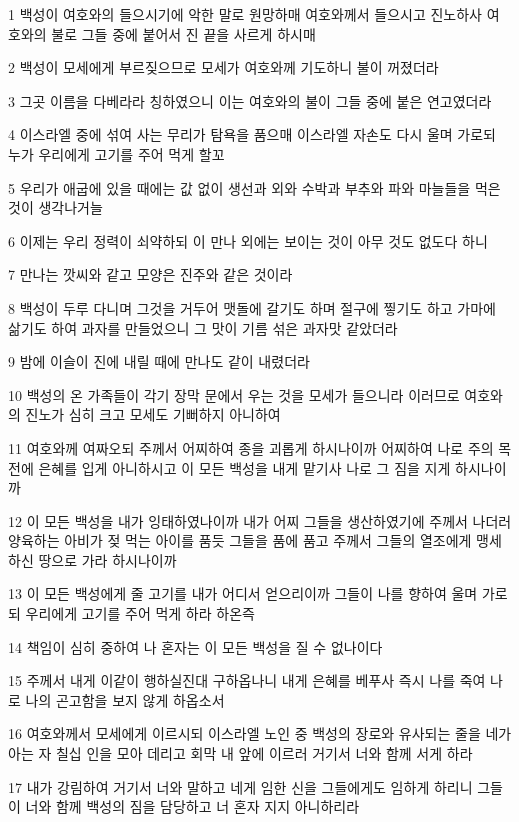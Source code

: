 \par 1 백성이 여호와의 들으시기에 악한 말로 원망하매 여호와께서 들으시고 진노하사 여호와의 불로 그들 중에 붙어서 진 끝을 사르게 하시매
\par 2 백성이 모세에게 부르짖으므로 모세가 여호와께 기도하니 불이 꺼졌더라
\par 3 그곳 이름을 다베라라 칭하였으니 이는 여호와의 불이 그들 중에 붙은 연고였더라
\par 4 이스라엘 중에 섞여 사는 무리가 탐욕을 품으매 이스라엘 자손도 다시 울며 가로되 누가 우리에게 고기를 주어 먹게 할꼬
\par 5 우리가 애굽에 있을 때에는 값 없이 생선과 외와 수박과 부추와 파와 마늘들을 먹은 것이 생각나거늘
\par 6 이제는 우리 정력이 쇠약하되 이 만나 외에는 보이는 것이 아무 것도 없도다 하니
\par 7 만나는 깟씨와 같고 모양은 진주와 같은 것이라
\par 8 백성이 두루 다니며 그것을 거두어 맷돌에 갈기도 하며 절구에 찧기도 하고 가마에 삶기도 하여 과자를 만들었으니 그 맛이 기름 섞은 과자맛 같았더라
\par 9 밤에 이슬이 진에 내릴 때에 만나도 같이 내렸더라
\par 10 백성의 온 가족들이 각기 장막 문에서 우는 것을 모세가 들으니라 이러므로 여호와의 진노가 심히 크고 모세도 기뻐하지 아니하여
\par 11 여호와께 여짜오되 주께서 어찌하여 종을 괴롭게 하시나이까 어찌하여 나로 주의 목전에 은혜를 입게 아니하시고 이 모든 백성을 내게 맡기사 나로 그 짐을 지게 하시나이까
\par 12 이 모든 백성을 내가 잉태하였나이까 내가 어찌 그들을 생산하였기에 주께서 나더러 양육하는 아비가 젖 먹는 아이를 품듯 그들을 품에 품고 주께서 그들의 열조에게 맹세하신 땅으로 가라 하시나이까
\par 13 이 모든 백성에게 줄 고기를 내가 어디서 얻으리이까 그들이 나를 향하여 울며 가로되 우리에게 고기를 주어 먹게 하라 하온즉
\par 14 책임이 심히 중하여 나 혼자는 이 모든 백성을 질 수 없나이다
\par 15 주께서 내게 이같이 행하실진대 구하옵나니 내게 은혜를 베푸사 즉시 나를 죽여 나로 나의 곤고함을 보지 않게 하옵소서
\par 16 여호와께서 모세에게 이르시되 이스라엘 노인 중 백성의 장로와 유사되는 줄을 네가 아는 자 칠십 인을 모아 데리고 회막 내 앞에 이르러 거기서 너와 함께 서게 하라
\par 17 내가 강림하여 거기서 너와 말하고 네게 임한 신을 그들에게도 임하게 하리니 그들이 너와 함께 백성의 짐을 담당하고 너 혼자 지지 아니하리라
